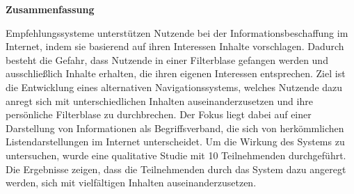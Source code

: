 \newpage

\thispagestyle{empty}

\vspace*{1cm}
\begin{center}
    {\Huge \bf Zusammenfassung}
\end{center}
\vspace*{1.4cm}

Empfehlungssysteme unterstützen Nutzende bei der Informationsbeschaffung im Internet, indem sie basierend auf ihren Interessen Inhalte vorschlagen.
Dadurch besteht die Gefahr, dass Nutzende in einer Filterblase gefangen werden und ausschließlich Inhalte erhalten, die ihren eigenen Interessen entsprechen.
Ziel ist die Entwicklung eines alternativen Navigationssystems, welches Nutzende dazu anregt sich mit unterschiedlichen Inhalten auseinanderzusetzen und ihre persönliche Filterblase zu durchbrechen.
Der Fokus liegt dabei auf einer Darstellung von Informationen als Begriffsverband, die sich von herkömmlichen Listendarstellungen im Internet unterscheidet.
Um die Wirkung des Systems zu untersuchen, wurde eine qualitative Studie mit 10 Teilnehmenden durchgeführt.
Die Ergebnisse zeigen, dass die Teilnehmenden durch das System dazu angeregt werden, sich mit vielfältigen Inhalten auseinanderzusetzen.
